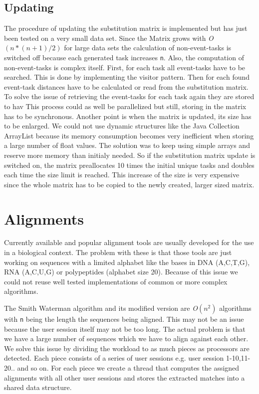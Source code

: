 \subsection{Updating}
	The procedure of updating the substitution matrix is implemented but has just been tested on a very small data set.
	Since the Matrix grows with \textit{O}$(n*(n+1)/2)$ for large data sets the calculation of non-event-tasks is switched off because each generated task increases \texttt{n}.
	Also, the computation of non-event-tasks is complex itself.
	First, for each task all event-tasks have to be searched. This is done by implementing the visitor pattern.
	Then for each found event-task distances have to be calculated or read from the substitution matrix.
	To solve the issue of retrieving the event-tasks for each task again they are stored to hav
	This process could as well be parallelized but still, storing in the matrix has to be synchronous.
	Another point is when the matrix is updated, its size has to be enlarged.
	We could not use dynamic structures like the Java Collection ArrayList because its memory consumption becomes very inefficient when storing a large number of
	float values. The solution was to keep using simple arrays and reserve more memory than initialy needed.
	So if the substitution matrix update is switched on, the matrix preallocates 10 times the initial unique tasks and doubles each time the size limit is reached.
	This increase of the size is very expensive since the whole matrix has to be copied to the newly created, larger sized matrix.

\section{Alignments}
Currently available and popular alignment tools are usually developed for the use in a biological context.
The problem with these is that those tools are just working on sequences with a limited alphabet like the bases in DNA (A,C,T,G), RNA (A,C,U,G) or polypeptides (alphabet size 20).
Because of this issue we could not reuse well tested implementations of common or more complex algorithms.

The Smith Waterman algorithm and its modified version are \textit{O}$(n^2)$ algorithms with \texttt{n} being the length the sequences being aligned.
This may not be an issue because the user session itself may not be too long.
The actual problem is that we have a large number of sequences which we have to align against each other.
We solve this issue by dividing the workload to as much pieces as processors are detected. Each piece consists of a series of user sessions e.g. user session 1-10,11-20.. and so on.
For each piece we create a thread that computes the assigned alignments with all other user sessions and stores the extracted matches into a shared data structure.


